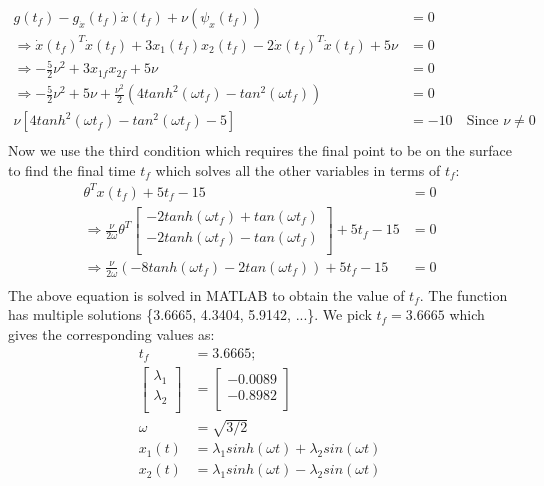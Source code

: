\begin{enumerate}
\begin{enumerate}
    \begin{align*}
   g(t_f) - g_{\dot x}(t_f) \dot x(t_f) + \nu (\psi_x(t_f)) &= 0 \\
   \Rightarrow \dot{x}(t_f)^{T} \dot{x}(t_f)+ 3 x_{1}(t_f) x_{2}(t_f) - 2 \dot{x}(t_f)^{T} \dot{x}(t_f) + 5\nu &= 0\\
   \Rightarrow -\frac{5}{2}\nu^2 + 3 x_{1f} x_{2f} + 5\nu &= 0\\
   \Rightarrow -\frac{5}{2}\nu^2 + 5\nu + \frac{ \nu^2}{2} (4 tanh^2(\omega t_f) - tan^2(\omega t_f)) &= 0\\
   \nu \left[ 4 tanh^2(\omega t_f) - tan^2(\omega t_f) -5 \right] &= -10\quad \text{Since } \nu \neq 0 \\
   \end{align*}
   Now we use the third condition which requires the final point to be on the surface to find the final time $t_f$ which solves all the other variables in terms of $t_f$:
   \begin{align*}
    \theta^{T} x(t_f) + 5t_f - 15 &= 0\\
    \Rightarrow \frac{\nu}{2 \omega} \theta^{T} 
    \begin{bmatrix}
    -2tanh(\omega t_f) + tan(\omega t_f)\\
    -2tanh(\omega t_f) - tan(\omega t_f)\\
  \end{bmatrix} + 5t_f - 15 &= 0\\ 
  \Rightarrow \frac{\nu}{2 \omega} (-8 tanh(\omega t_f) -2 tan(\omega t_f) ) + 5t_f - 15 &= 0\\
\end{align*}
The above equation is solved in MATLAB to obtain the value of $t_f$. The function has multiple solutions \{3.6665, 4.3404, 5.9142, ...\}. We pick $t_f = 3.6665$ which gives the corresponding values as:
\begin{align*}
 t_f &= 3.6665;\\
 \begin{bmatrix}
  \lambda_1 \\
  \lambda_2 \\
 \end{bmatrix} &= 
 \begin{bmatrix}
  -0.0089 \\
  -0.8982 \\
 \end{bmatrix}\\
 \omega &= \sqrt{3/2}\\
 x_1(t) &= \lambda_1 sinh(\omega t) + \lambda_2 sin(\omega t) \\
 x_2(t) &= \lambda_1 sinh(\omega t) - \lambda_2 sin(\omega t) \\
\end{align*}


\end{enumerate}
\end{enumerate}
